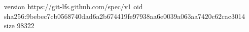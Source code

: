 version https://git-lfs.github.com/spec/v1
oid sha256:9bebec7cb0568740dad6a2b674419fe97938aa6e0039a063aa7420c62cac3014
size 98322
